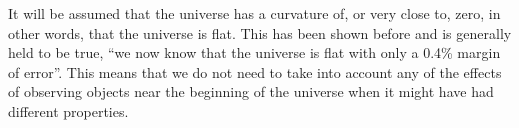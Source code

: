     	It will be assumed that the universe has a curvature of, or very close to, zero\cite{1102.4485}, in other words, that the universe is flat. This has been shown before and is generally held to be true, ``we now know that the universe is flat with only a 0.4\% margin of error''\cite{nasa_uni_shape}. This means that we do not need to take into account any of the effects of observing objects near the beginning of the universe when it might have had different properties.

